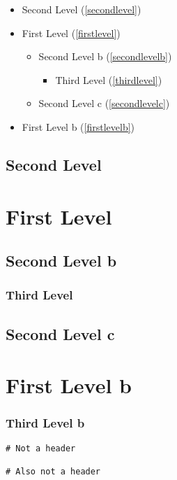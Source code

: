 
\def\mytitle{Table of Contents Test}


\begin{itemize}
\item Second Level (\autoref{secondlevel})

\item First Level (\autoref{firstlevel})

\begin{itemize}
\item Second Level b (\autoref{secondlevelb})

\begin{itemize}
\item Third Level (\autoref{thirdlevel})

\end{itemize}

\item Second Level c (\autoref{secondlevelc})

\end{itemize}

\item First Level b (\autoref{firstlevelb})

\end{itemize}

\chapter{Second Level}
\label{secondlevel}

\part{First Level}
\label{firstlevel}

\chapter{Second Level b}
\label{secondlevelb}

\section{Third Level}
\label{thirdlevel}

\chapter{Second Level c}
\label{secondlevelc}

\part{First Level b}
\label{firstlevelb}

\section{Third Level b}
\label{thirdlevelb}

\begin{verbatim}
# Not a header

# Also not a header 
\end{verbatim}




